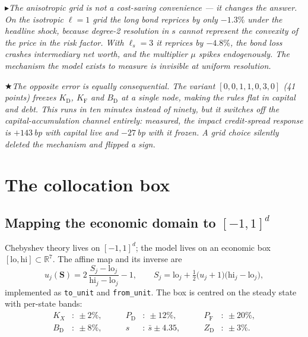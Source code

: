 \documentclass[11pt]{article}
\numberwithin{equation}{section}
\newcommand{\R}{\mathbb{R}}
\newcommand{\code}[1]{\texttt{\small #1}}
\newcommand{\D}{\mathrm{D}}
\newcommand{\F}{\mathrm{F}}
\newcommand{\bS}{\mathbf{S}}
\theoremstyle{definition}
\theoremstyle{plain}
\theoremstyle{remark}
\newcommand{\trick}[1]{\par\smallskip\noindent
  \textcolor{notec}{$\blacktriangleright$}\;\emph{#1}\par\smallskip}
\newcommand{\warn}[1]{\par\smallskip\noindent
  \textcolor{red!60!black}{$\bigstar$}\;\emph{#1}\par\smallskip}
\begin{document}
\trick{The anisotropic grid is not a cost-saving convenience --- it changes the
answer. On the isotropic $\ell=1$ grid the long bond reprices by only $-1.3\%$ under
the headline shock, because degree-2 resolution in $s$ cannot represent the convexity
of the price in the risk factor. With $\ell_s=3$ it reprices by $-4.8\%$, the bond
loss crashes intermediary net worth, and the multiplier $\mu$ spikes endogenously.
The mechanism the model exists to measure is invisible at uniform resolution.}

\warn{The opposite error is equally consequential. The variant
$[0,0,1,1,0,3,0]$ (41 points) freezes $K_\D$, $K_\F$ and $B_\D$ at a single node,
making the rules \emph{flat} in capital and debt. This runs in ten minutes instead of
ninety, but it switches off the capital-accumulation channel entirely: measured, the
impact credit-spread response is $+143$\,bp with capital live and $-27$\,bp with it
frozen. A grid choice silently deleted the mechanism and flipped a sign.}

\section{The collocation box}
\label{sec:box}

\subsection{\texorpdfstring{Mapping the economic domain to $[-1,1]^{d}$}
                          {Mapping the economic domain to the unit box}}

Chebyshev theory lives on $[-1,1]^{d}$; the model lives on an economic box
$[\text{lo},\text{hi}]\subset\R^{7}$. The affine map and its inverse are
\begin{equation}
u_j(\bS)=2\,\frac{S_j-\text{lo}_j}{\text{hi}_j-\text{lo}_j}-1,
\qquad
S_j=\text{lo}_j+\tfrac12\bigl(u_j+1\bigr)\bigl(\text{hi}_j-\text{lo}_j\bigr),
\label{eq:box-map}
\end{equation}
implemented as \code{to\_unit} and \code{from\_unit}. The box is centred on the
steady state with per-state bands:
\begin{equation}
\begin{aligned}
K_X&:\ \pm2\%, &\qquad P_\D&:\ \pm12\%, &\qquad P_\F&:\ \pm20\%,\\
B_\D&:\ \pm8\%, &\qquad s&:\ \bar s\pm4.35, &\qquad Z_\D&:\ \pm3\% .
\end{aligned}
\label{eq:bands}
\end{equation}
\end{document}

